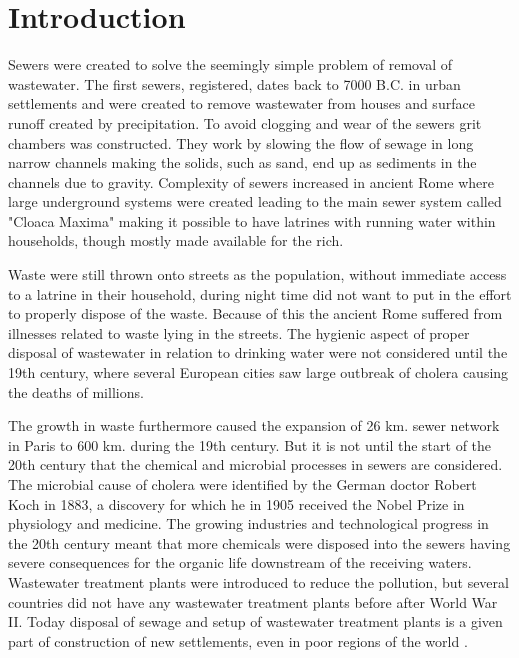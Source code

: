 \chapter{Introduction}
\label{ch:introduction}

Sewers were created to solve the seemingly simple problem of removal of wastewater. The first sewers, registered, dates back to 7000 B.C. in urban settlements and were created to remove wastewater from houses and surface runoff created by precipitation. To avoid clogging and wear of the sewers grit chambers was constructed. They work by slowing the flow of sewage in long narrow channels making the solids, such as sand, end up as sediments in the channels due to gravity. Complexity of sewers increased in ancient Rome where large underground systems were created leading to the main sewer system called "Cloaca Maxima" making it possible to have latrines with running water within households, though mostly made available for the rich.

Waste were still thrown onto streets as the population, without immediate access to a latrine in their household, during night time did not want to put in the effort to properly dispose of the waste. Because of this the ancient Rome suffered from illnesses related to waste lying in the streets. The hygienic aspect of proper disposal of wastewater in relation to drinking water were not considered until the 19th century, where several European cities saw large outbreak of cholera causing the deaths of millions. 

The growth in waste furthermore caused the expansion of 26 km. sewer network in Paris to 600 km. during the 19th century. But it is not until the start of the 20th century that the chemical and microbial processes in sewers are considered. The microbial cause of cholera were identified by the German doctor Robert Koch in 1883, a discovery for which he in 1905 received the Nobel Prize in physiology and medicine. The growing industries and technological progress in the 20th century meant that more chemicals were disposed into the sewers having severe consequences for the organic life downstream of the receiving waters. Wastewater treatment plants were introduced to reduce the pollution, but several countries did not have any wastewater treatment plants before after World War II. Today disposal of sewage and setup of wastewater treatment plants is a given part of construction of new settlements, even in poor regions of the world \cite{Sewer_processes}.


